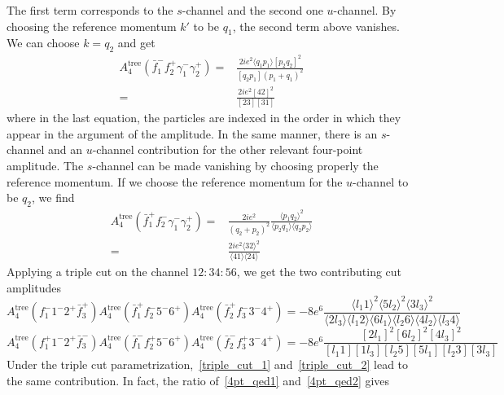 The first term corresponds to the $s$-channel and the second one $u$-channel.
By choosing the reference momentum $k'$ to be $q_1$, the second term above vanishes. 
We can choose $k = q_2$ and get 
\begin{equation}\label{4pt_qed1}
\begin{split}
A_{4}^{\mathrm{tree}}(\bar{f}_1^- f_2^+ \gamma_1^-\gamma_2^+) 
= &
\frac{2ie^2\langle q_1 p_1 \rangle[p_2 q_2]^2}{[q_2 p_1](p_1+q_1)^2}
\\ 
= &
\frac{2ie^2[42]^2}{[23][31]}
\end{split}
\end{equation}
where in the last equation, the particles are indexed in the order in which they appear in the argument of the amplitude.
In the same manner, there is an $s$-channel and an $u$-channel contribution for the other relevant four-point amplitude. 
The $s$-channel can be made vanishing by choosing properly the reference momentum. 
If we choose the reference momentum for the $u$-channel to be $q_2$, we find 
\begin{equation}\label{4pt_qed2}
\begin{split}
A_4^{\mathrm{tree}}(\bar{f}_1^+ f_2^- \gamma_1^- \gamma_2^+) = & \frac{2ie^2}{(q_2+p_2)^2}\frac{\langle p_1q_2\rangle^2}{\langle p_2q_1\rangle\langle q_2p_2\rangle}
\\
= &
\frac{2ie^2\langle 32\rangle^2}{\langle 41 \rangle\langle 24\rangle}
\end{split}
\end{equation}
Applying a triple cut on the channel $12:34:56$, we get the two contributing cut amplitudes
\begin{equation}\label{triple_cut_1}
A_{4}^{\mathrm{tree}}(f_1^- 1^-2^+\bar{f}_3^+)
A_4^{\mathrm{tree}}(\bar{f}_1^+f_2^-5^-6^+)
A_4^{\mathrm{tree}}(\bar{f}_2^+ f_3^-3^-4^+)
=
-8e^6\frac{\langle l_1 1\rangle^2 \langle 5l_2 \rangle^2\langle 3l_3\rangle^2}{\langle2 l_3\rangle\langle l_1 2\rangle\langle 6 l_1 \rangle\langle l_2 6\rangle\langle 4 l_2\rangle\langle l_3 4\rangle}
\end{equation}
\begin{equation}\label{triple_cut_2}
A_{4}^{\mathrm{tree}}(f_1^+ 1^-2^+\bar{f}_3^-)
A_4^{\mathrm{tree}}(\bar{f}_1^-f_2^+5^-6^+)
A_4^{\mathrm{tree}}(\bar{f}_2^- f_3^+3^-4^+)
=
-8e^6\frac{[2l_1]^2[6l_2]^2[4l_3]^2}{[l_1 1 ][1l_3][l_2 5][5l_1][l_2 3][3l_3]}
\end{equation}
Under the triple cut parametrization,~\cref{triple_cut_1} and~\cref{triple_cut_2} lead to the same contribution. 
In fact, the ratio of~\cref{4pt_qed1} and~\cref{4pt_qed2} gives
\begin{equation*}

\end{equation*} 












